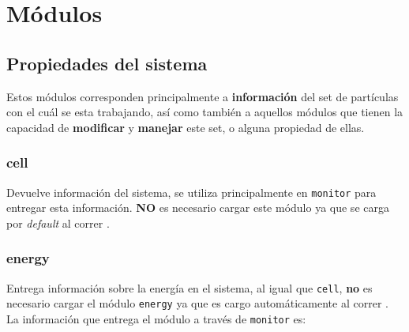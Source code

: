 \chapter{M\'odulos}
\label{chap:modulos}

\section{Propiedades del sistema}
Estos m\'odulos corresponden principalmente a \textbf{informaci\'on} del set de part\'iculas con el cu\'al se esta trabajando, as\'i como tambi\'en a aquellos m\'odulos que tienen la capacidad de \textbf{modificar} y \textbf{manejar} este set, o alguna propiedad de ellas.
\subsection{cell}
Devuelve informaci\'on del sistema, se utiliza principalmente en \verb|monitor| para entregar esta informaci\'on. \textbf{NO} es necesario cargar este m\'odulo ya que se carga por \textit{default} al correr \lpmd.


\subsection{energy}
Entrega informaci\'on sobre la energ\'ia en el sistema, al igual que \verb|cell|, \textbf{no} es necesario cargar el m\'odulo \verb|energy| ya que es cargo autom\'aticamente al correr \lpmd. La informaci\'on que entrega el m\'odulo a trav\'es de \verb|monitor| es:


